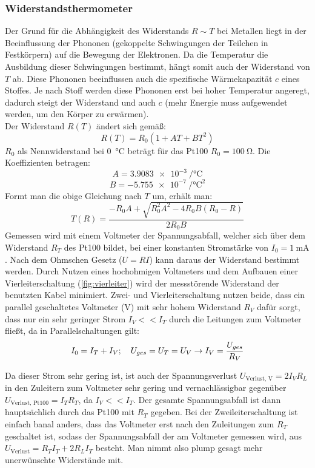 \subsubsection{Widerstandsthermometer}
Der Grund für die Abhängigkeit des Widerstands \(R \sim  T\) bei Metallen liegt in der Beeinflussung der Phononen (gekoppelte Schwingungen der Teilchen in Festkörpern) auf die Bewegung der Elektronen. Da die Temperatur die Ausbildung dieser Schwingungen bestimmt, hängt somit auch der Widerstand von \(T\) ab. Diese Phononen beeinflussen auch die spezifische Wärmekapazität \(c\) eines Stoffes. Je nach Stoff werden diese Phononen erst bei hoher Temperatur angeregt, dadurch steigt der Widerstand und auch \(c\) (mehr Energie muss aufgewendet werden, um den Körper zu erwärmen).\\
Der Widerstand \(R(T)\) ändert sich gemäß:
\begin{equation}
    R(T)=R_0(1+AT+BT^2)
    \label{eq:R(T)}
\end{equation}
\(R_0\) als Nennwiderstand bei \qty{0}{\degreeCelsius} beträgt für das Pt100 \(R_0=\qty{100}{\ohm}\). Die Koeffizienten betragen:
\[A=3.9083\qty{e-3}{\per\degreeCelsius}\]
\[B=\qty{-5.755e-7}{\per\degreeCelsius\squared}\]
Formt man die obige Gleichung nach \(T\) um, erhält man:
\begin{equation}
T(R) = \frac{-R_{0}A + \sqrt{R_{0}^{2}A^{2} - 4R_{0}B(R_{0} - R)}}{2R_{0}B}
\label{eq:T(R)}
\end{equation} 
Gemessen wird mit einem Voltmeter der Spannungsabfall, welcher sich über dem Widerstand \(R_T\) des Pt100 bildet, bei einer konstanten Stromstärke von \(I_0=\qty{1}{\milli\ampere}\). Nach dem Ohmschen Gesetz (\(U=RI\)) kann daraus der Widerstand bestimmt werden. Durch Nutzen eines hochohmigen Voltmeters und dem Aufbauen einer Vierleiterschaltung (\cref{fig:vierleiter}) wird der messstörende Widerstand der benutzten Kabel minimiert. Zwei- und Vierleiterschaltung nutzen beide, dass ein parallel geschaltetes Voltmeter (V) mit sehr hohem Widerstand \(R_V\) dafür sorgt, dass nur ein sehr geringer Strom \(I_V<<I_T\) durch die Leitungen zum Voltmeter fließt, da in Parallelschaltungen gilt:
\[I_0=I_T+I_V;\quad U_{ges}=U_T=U_V \\
\rightarrow I_V=\frac{U_{ges}}{R_V}\]

Da dieser Strom sehr gering ist, ist auch der Spannungsverlust \(U_{\text{Verlust, V}}=2I_VR_L\) in den Zuleitern zum Voltmeter sehr gering und vernachlässigbar gegenüber \(U_{\text{Verlust, Pt100}}=I_TR_T\), da \(I_V<<I_T\). Der gesamte Spannungsabfall ist dann hauptsächlich durch das Pt100 mit \(R_T\) gegeben. Bei der Zweileiterschaltung ist einfach banal anders, dass das Voltmeter erst nach den Zuleitungen zum \(R_T\) geschaltet ist, sodass der Spannungsabfall der am Voltmeter gemessen wird, aus \(U_{\text{Verlust}}=R_TI_T+2R_LI_T\) besteht. Man nimmt also plump gesagt mehr unerwünschte Widerstände mit.  

